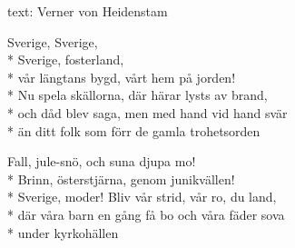 \begin{SongText}[Sverige]
    \begin{SongInfo}
        text: Verner von Heidenstam
    \end{SongInfo}
    \begin{Verse}
        Sverige, Sverige,\\*%
        Sverige, fosterland,\\*%
        vår längtans bygd, vårt hem på jorden!\\*%
        Nu spela skällorna, där härar lysts av brand,\\*%
        och dåd blev saga, men med hand vid hand svär\\*%
        än ditt folk som förr de gamla trohetsorden
    \end{Verse}
    \begin{Verse}
        Fall, jule-snö, och suna djupa mo!\\*%
        Brinn, österstjärna, genom junikvällen!\\*%
        Sverige, moder! Bliv vår strid, vår ro, du land,\\*%
        där våra barn en gång få bo och våra fäder sova\\*%
        under kyrkohällen
    \end{Verse}
\end{SongText}

